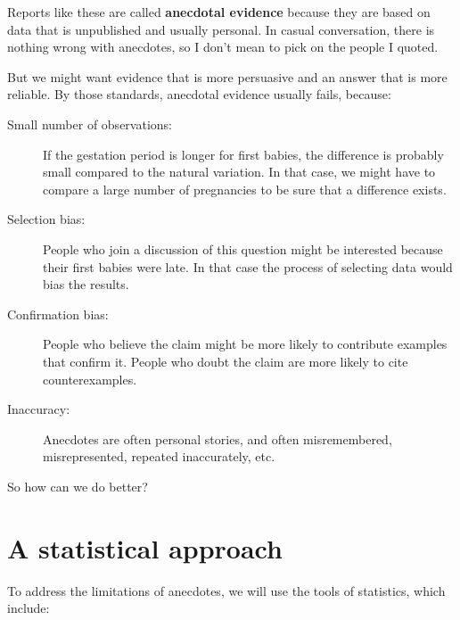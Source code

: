 \documentclass[12pt]{book}
\begin{document}
Reports like these are called {\bf anecdotal evidence} because they
are based on data that is unpublished and usually personal.  In casual
conversation, there is nothing wrong with anecdotes, so I don't mean
to pick on the people I quoted.

But we might want evidence that is more persuasive and
an answer that is more reliable.  By those standards, anecdotal
evidence usually fails, because:

\begin{description}

\item[Small number of observations:] If the gestation period is longer
  for first babies, the difference is probably small compared to the
  natural variation.  In that case, we might have to compare a large
  number of pregnancies to be sure that a difference exists.

\item[Selection bias:] People who join a discussion of this question
  might be interested because their first babies were late.  In that
  case the process of selecting data would bias the results.

\item[Confirmation bias:] People who believe the claim might be more
  likely to contribute examples that confirm it.  People who doubt the
  claim are more likely to cite counterexamples.

\item[Inaccuracy:] Anecdotes are often personal stories, and often
  misremembered, misrepresented, repeated
  inaccurately, etc.

\end{description}

So how can we do better?

\section{A statistical approach}

To address the limitations of anecdotes, we will use the tools
of statistics, which include:
\end{document}
